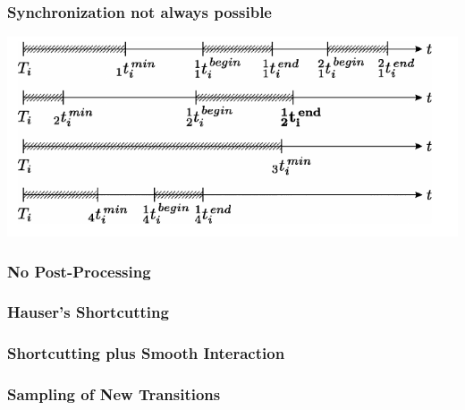 \documentclass[12pt, %
			  t     %
]{beamer}%
\begin{document}
\begin{frame}
\frametitle{Synchronization not always possible}
\centering
\includegraphics[scale=0.5]{../Images/SynchronizationNotPossible_2.png}
\end{frame}



\begin{frame}
\label{Video_Step1}
\frametitle{No Post-Processing}
\centering
{}
\hyperlink{Plot_Step1}{}
\end{frame}

\begin{frame}
\label{Video_Step2}
\frametitle{Hauser's Shortcutting}
\centering
{}
\hyperlink{Plot_Step2}{}
\end{frame}

\begin{frame}
\label{Video_Step3}
\frametitle{Shortcutting plus Smooth Interaction}
\centering
{}
\hyperlink{Plot_Step3}{}
\end{frame}

\begin{frame}
\label{Video_Step4}
\frametitle{Sampling of New Transitions}
\centering
{}
\hyperlink{Plot_Step4}{}
\end{frame}
\end{document}
